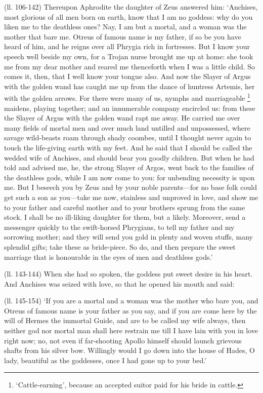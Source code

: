 (ll. 106-142) Thereupon Aphrodite the daughter of Zeus answered him:
‘Anchises, most glorious of all men born on earth, know that I am no
goddess: why do you liken me to the deathless ones? Nay, I am but a mortal, and
a woman was the mother that bare me. Otreus of famous name is my father, if so
be you have heard of him, and he reigns over all Phrygia rich in fortresses.
But I know your speech well beside my own, for a Trojan nurse brought me up at
home: she took me from my dear mother and reared me thenceforth when I was a
little child. So comes it, then, that I well know your tongue also. And now the
Slayer of Argus with the golden wand has caught me up from the dance of
huntress Artemis, her with the golden arrows. For there were many of us, nymphs
and marriageable \footnote{‘Cattle-earning’, because an accepted suitor paid for his bride in
cattle.} maidens, playing together; and an
innumerable company encircled us: from these the Slayer of Argus with the
golden wand rapt me away. He carried me over many fields of mortal men and over
much land untilled and unpossessed, where savage wild-beasts roam through shady
coombes, until I thought never again to touch the life-giving earth with my
feet. And he said that I should be called the wedded wife of Anchises, and
should bear you goodly children. But when he had told and advised me, he, the
strong Slayer of Argos, went back to the families of the deathless gods, while
I am now come to you: for unbending necessity is upon me. But I beseech you by
Zeus and by your noble parents—for no base folk could get such a son as
you—take me now, stainless and unproved in love, and show me to your
father and careful mother and to your brothers sprung from the same stock. I
shall be no ill-liking daughter for them, but a likely. Moreover, send a
messenger quickly to the swift-horsed Phrygians, to tell my father and my
sorrowing mother; and they will send you gold in plenty and woven stuffs, many
splendid gifts; take these as bride-piece. So do, and then prepare the sweet
marriage that is honourable in the eyes of men and deathless gods.’

(ll. 143-144) When she had so spoken, the goddess put sweet desire in his
heart. And Anchises was seized with love, so that he opened his mouth and said:

(ll. 145-154) ‘If you are a mortal and a woman was the mother who bare
you, and Otreus of famous name is your father as you say, and if you are come
here by the will of Hermes the immortal Guide, and are to be called my wife
always, then neither god nor mortal man shall here restrain me till I have lain
with you in love right now; no, not even if far-shooting Apollo himself should
launch grievous shafts from his silver bow. Willingly would I go down into the
house of Hades, O lady, beautiful as the goddesses, once I had gone up to your
bed.’

